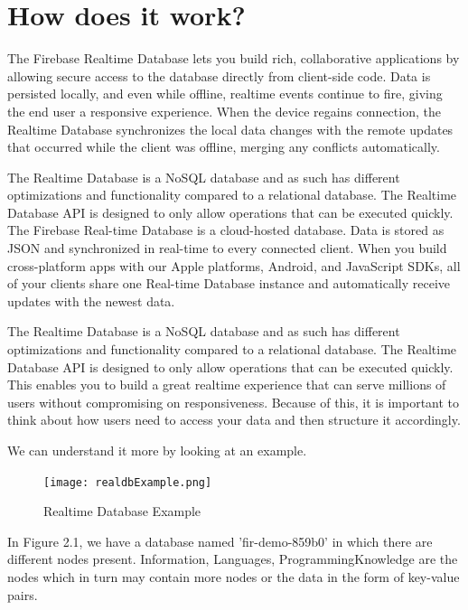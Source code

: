 \documentclass[12pt,a4paper]{report}
\begin{document}
\section{{\fontsize{16}{0}\selectfont How does it work?}}
{\fontsize{14}{0}\selectfont
\noindent
The Firebase Realtime Database lets you build rich, collaborative applications by allowing secure access to the database directly from client-side code. Data is persisted locally, and even while offline, realtime events continue to fire, giving the end user a responsive experience. When the device regains connection, the Realtime Database synchronizes the local data changes with the remote updates that occurred while the client was offline, merging any conflicts automatically.

\hspace{1cm}The Realtime Database is a NoSQL database and as such has different optimizations and functionality compared to a relational database. The Realtime Database \ac{API} is designed to only allow operations that can be executed quickly. The Firebase Real-time Database is a cloud-hosted database. Data is stored as \ac{JSON} and synchronized in real-time to every connected client. When you build cross-platform apps with our Apple platforms, Android, and JavaScript \ac{SDK}s, all of your clients share one Real-time Database instance and automatically receive updates with the newest data.

\hspace{1cm}The Realtime Database is a NoSQL database and as such has different optimizations and functionality compared to a relational database. The Realtime Database \ac{API} is designed to only allow operations that can be executed quickly. This enables you to build a great realtime experience that can serve millions of users without compromising on responsiveness. Because of this, it is important to think about how users need to access your data and then structure it accordingly.

\hspace{1cm}We can understand it more by looking at an example.
\begin{figure}[ht]
    \centering
    \texttt{[image: realdbExample.png]}
    \caption{\fontsize{12}{0}\selectfont Realtime Database Example}
    \label{fig:Example Database}
\end{figure}

\hspace{1cm}In Figure 2.1, we have a database named 'fir-demo-859b0' in which there are different nodes present. Information, Languages, ProgrammingKnowledge are the nodes which in turn may contain more nodes or the data in the form of key-value pairs.

}
\end{document}
